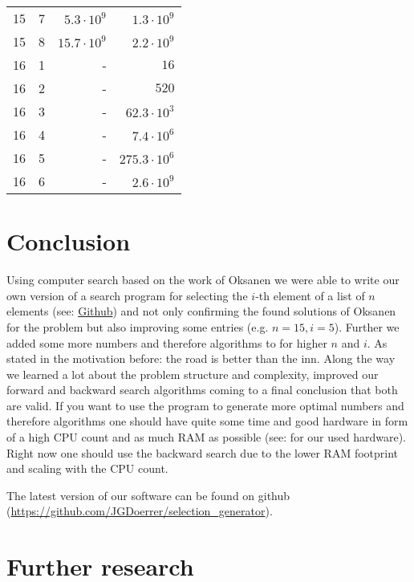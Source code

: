 \documentclass[twoside,leqno,twocolumn]{article}
\begin{document}
\begin{table}[!t]
\begin{tabular}{c|c|r|r}
    15  & 7   & $5.3 \cdot 10^9$        & $1.3 \cdot 10^9$         \\
    15  & 8   & $15.7 \cdot 10^9$       & $2.2 \cdot 10^9$         \\
    \hline
    16  & 1   & -                       & $16$                     \\
    16  & 2   & -                       & $520$                    \\
    16  & 3   & -                       & $62.3 \cdot 10^3$        \\
    16  & 4   & -                       & $7.4 \cdot 10^6$         \\
    16  & 5   & -                       & $275.3 \cdot 10^6$       \\
    16  & 6   & -                       & $2.6 \cdot 10^9$         \\
  \end{tabular}
\end{table}


\section{Conclusion}

Using computer search based on the work of Oksanen we were able to write our own version of a search program for selecting the $i$-th element of a list of $n$ elements (see: \href{https://github.com/JGDoerrer/selection_generator}{Github}) and not only confirming the found solutions of Oksanen for the problem but also improving some entries (e.g. $n = 15, i = 5$).
Further we added some more numbers and therefore algorithms to  for higher $n$ and $i$.
As stated in the motivation before: the road is better than the inn.
Along the way we learned a lot about the problem structure and complexity, improved our forward and backward search algorithms coming to a final conclusion that both are valid.
If you want to use the program to generate more optimal numbers and therefore algorithms one should have quite some time and good hardware in form of a high CPU count and as much RAM as possible (see:  for our used hardware).
Right now one should use the backward search due to the lower RAM footprint and scaling with the CPU count.

The latest version of our software can be found on github (\url{https://github.com/JGDoerrer/selection_generator}).

\section{Further research}
\end{document}
